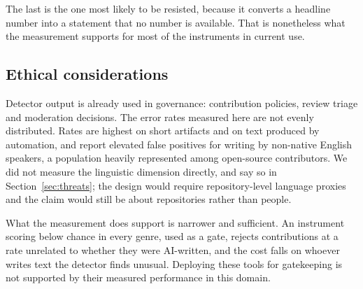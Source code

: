 The last is the one most likely to be resisted, because it converts a headline number
into a statement that no number is available. That is nonetheless what the measurement
supports for most of the instruments in current use.

\subsection{Ethical considerations}
\label{sec:discussion:ethics}

Detector output is already used in governance: contribution policies, review triage and
moderation decisions. The error rates measured here are not evenly distributed. Rates
are highest on short artifacts and on text produced by automation, and
\citet{liang2023biased} report elevated false positives for writing by non-native
English speakers, a population heavily represented among open-source contributors. We
did not measure the linguistic dimension directly, and say so in
Section~\ref{sec:threats}; the design would require repository-level language proxies
and the claim would still be about repositories rather than people.

What the measurement does support is narrower and sufficient. An instrument scoring
below chance in every genre, used as a gate, rejects contributions at a rate unrelated
to whether they were AI-written, and the cost falls on whoever writes text the detector
finds unusual. Deploying these tools for gatekeeping is not supported by their measured
performance in this domain.
